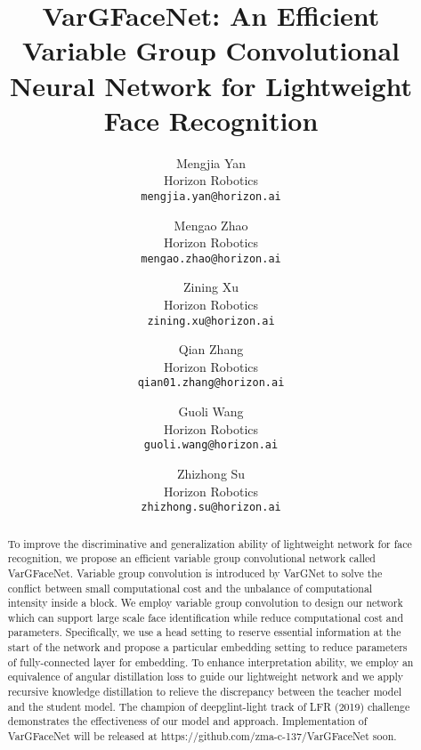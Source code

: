 \documentclass[10pt,twocolumn,letterpaper]{article}
\begin{document}
\title{ VarGFaceNet: An Efficient Variable Group Convolutional Neural Network for Lightweight Face Recognition}

\author{Mengjia Yan\\
Horizon Robotics\\
{\tt\small mengjia.yan@horizon.ai}
\and
Mengao Zhao\\
Horizon Robotics\\
{\tt\small mengao.zhao@horizon.ai}
\and
Zining Xu\\
Horizon Robotics\\
{\tt\small zining.xu@horizon.ai}
\and
Qian Zhang\\
Horizon Robotics\\
{\tt\small qian01.zhang@horizon.ai}
\and
Guoli Wang\\
Horizon Robotics\\
{\tt\small guoli.wang@horizon.ai}
\and
Zhizhong Su\\
Horizon Robotics\\
{\tt\small zhizhong.su@horizon.ai}
}

\maketitle
\ificcvfinal\thispagestyle{empty}\fi

\begin{abstract}
	
	To improve the discriminative and generalization ability of lightweight network for face recognition, we propose an efficient variable group convolutional network called VarGFaceNet. Variable group convolution is introduced by VarGNet to solve the conflict between small computational cost and the unbalance of computational intensity inside a block. We employ variable group convolution to design our network which can support large scale face identification while reduce computational cost and parameters. Specifically, we use a head setting to reserve essential information at the start of the network and propose a particular embedding setting to reduce parameters of fully-connected layer for embedding.  To enhance interpretation ability, we employ an equivalence of angular distillation loss to guide our lightweight network and we apply recursive knowledge distillation to relieve the discrepancy between the teacher model and the student model.  The champion of deepglint-light track of LFR (2019) challenge demonstrates the effectiveness of our model and approach. Implementation of VarGFaceNet will be released at https://github.com/zma-c-137/VarGFaceNet soon.
	
\end{abstract}
\end{document}
